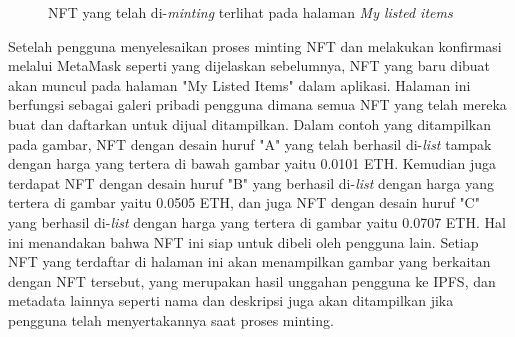   
  \begin{figure} [H] \centering
    \caption{NFT yang telah di-\emph{minting} terlihat pada halaman \emph{My listed items}}
    \label{fig:listeditem}
  \end{figure}

  Setelah pengguna menyelesaikan proses minting NFT dan melakukan konfirmasi melalui MetaMask seperti yang dijelaskan sebelumnya, NFT yang baru dibuat akan muncul pada halaman "My Listed Items" dalam aplikasi. Halaman ini berfungsi sebagai galeri pribadi pengguna dimana semua NFT yang telah mereka buat dan daftarkan untuk dijual ditampilkan. Dalam contoh yang ditampilkan pada gambar, NFT dengan desain huruf "A" yang telah berhasil di-\emph{list} tampak dengan harga yang tertera di bawah gambar yaitu 0.0101 ETH. Kemudian juga terdapat NFT dengan desain huruf "B" yang berhasil di-\emph{list} dengan harga yang tertera di gambar yaitu 0.0505 ETH, dan juga NFT dengan desain huruf "C" yang berhasil di-\emph{list} dengan harga yang tertera di gambar yaitu 0.0707 ETH. Hal ini menandakan bahwa NFT ini siap untuk dibeli oleh pengguna lain. Setiap NFT yang terdaftar di halaman ini akan menampilkan gambar yang berkaitan dengan NFT tersebut, yang merupakan hasil unggahan pengguna ke IPFS, dan metadata lainnya seperti nama dan deskripsi juga akan ditampilkan jika pengguna telah menyertakannya saat proses minting.

